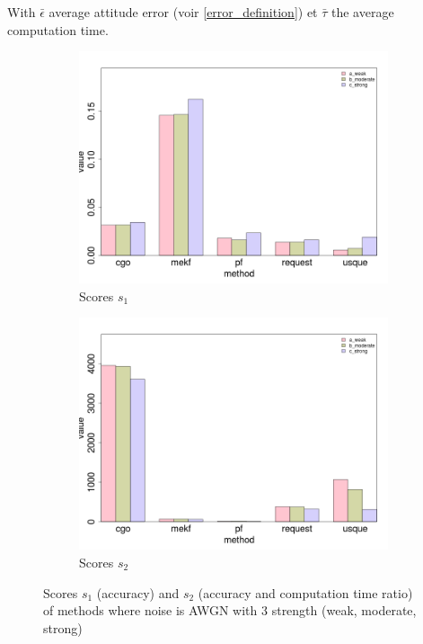 With $\bar{\epsilon}$ average attitude error (voir \ref{error_definition}) et $\bar{\tau}$ the average computation time. \\
\begin{figure}[!h]

\begin{subfigure}{.5\textwidth}
\centering
\includegraphics[scale=0.28]{images/histo_s1_add.png}
\caption{Scores $s_1$}
\label{histo_s1_add}
\end{subfigure}

\begin{subfigure}{.5\textwidth}
\centering
\includegraphics[scale=0.28]{images/histo_s2_add.png}
\caption{Scores $s_2$ }
\label{histo_s2_add}
\end{subfigure}
\caption{Scores $s_1$ (accuracy) and $s_2$ (accuracy and computation time ratio) of methods where noise is AWGN with 3 strength (weak, moderate, strong)}
\end{figure}
